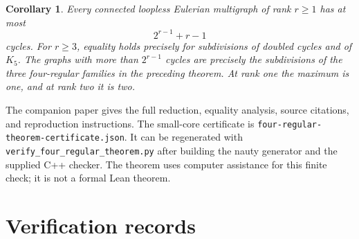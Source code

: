 \documentclass[11pt]{article}
\newtheorem{corollary}[theorem]{Corollary}
\begin{document}
\begin{corollary}
Every connected loopless Eulerian multigraph of rank $r\ge1$ has at most
\[
 2^{r-1}+r-1
\]
cycles.
For $r\ge3$, equality holds precisely for subdivisions of doubled cycles and of $K_5$.
The graphs with more than $2^{r-1}$ cycles are precisely the subdivisions of the three four-regular families in the preceding theorem.
At rank one the maximum is one, and at rank two it is two.
\end{corollary}

The companion paper gives the full reduction, equality analysis, source citations, and reproduction instructions.
The small-core certificate is \nolinkurl{four-regular-theorem-certificate.json}.
It can be regenerated with \nolinkurl{verify_four_regular_theorem.py} after building the nauty generator and the supplied C++ checker.
The theorem uses computer assistance for this finite check; it is not a formal Lean theorem.




\section{Verification records}
\end{document}
